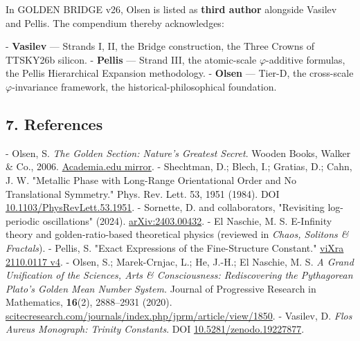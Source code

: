 In GOLDEN BRIDGE v26, Olsen is listed as \textbf{third author} alongside Vasilev and Pellis. The compendium thereby acknowledges:

- \textbf{Vasilev} --- Strands I, II, the Bridge construction, the Three Crowns of TTSKY26b silicon.
- \textbf{Pellis} --- Strand III, the atomic-scale $\varphi$-additive formulas, the Pellis Hierarchical Expansion methodology.
- \textbf{Olsen} --- Tier-D, the cross-scale $\varphi$-invariance framework, the historical-philosophical foundation.

\subsection{7. References}

- Olsen, S. \textit{The Golden Section: Nature's Greatest Secret}. Wooden Books, Walker \& Co., 2006. \href{https://www.academia.edu/118327755/Scott\_Olsen\_The\_Golden\_Section\_Nature\_s\_Greatest\_Secret}{Academia.edu mirror}.
- Shechtman, D.; Blech, I.; Gratias, D.; Cahn, J. W. "Metallic Phase with Long-Range Orientational Order and No Translational Symmetry." Phys. Rev. Lett. 53, 1951 (1984). DOI \href{https://doi.org/10.1103/PhysRevLett.53.1951}{10.1103/PhysRevLett.53.1951}.
- Sornette, D. and collaborators, "Revisiting log-periodic oscillations" (2024). \href{https://arxiv.org/abs/2403.00432}{arXiv:2403.00432}.
- El Naschie, M. S. E-Infinity theory and golden-ratio-based theoretical physics (reviewed in \textit{Chaos, Solitons \& Fractals}).
- Pellis, S. "Exact Expressions of the Fine-Structure Constant." \href{https://vixra.org/abs/2110.0117}{viXra 2110.0117 v4}.
- Olsen, S.; Marek-Crnjac, L.; He, J.-H.; El Naschie, M. S. \textit{A Grand Unification of the Sciences, Arts \& Consciousness: Rediscovering the Pythagorean Plato's Golden Mean Number System.} Journal of Progressive Research in Mathematics, \textbf{16}(2), 2888--2931 (2020). \href{http://scitecresearch.com/journals/index.php/jprm/article/view/1850}{scitecresearch.com/journals/index.php/jprm/article/view/1850}.
- Vasilev, D. \textit{Flos Aureus Monograph: Trinity Constants}. DOI \href{https://zenodo.org/doi/10.5281/zenodo.19227877}{10.5281/zenodo.19227877}.
